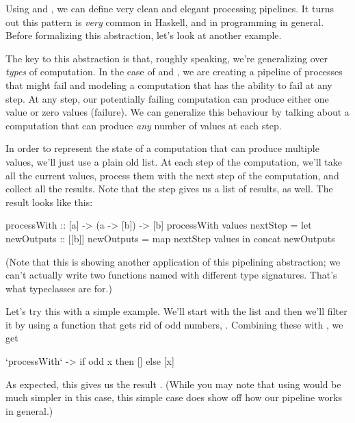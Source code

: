 Using  and , we can define very clean and elegant processing
pipelines. It turns out this pattern is \emph{very} common in Haskell, and in programming in
general. Before formalizing this abstraction, let's look at another example.

The key to this abstraction is that, roughly speaking, we're generalizing over \emph{types} of
computation. In the case of  and , we are creating a pipeline of
processes that might fail and modeling a computation that has the ability to fail at any step. At
any step, our potentially failing computation can produce either one value or zero values (failure).
We can generalize this behaviour by talking about a computation that can produce \emph{any} number
of values at each step.

In order to represent the state of a computation that can produce multiple values, we'll just use a
plain old list. At each step of the computation, we'll take all the current values, process them
with the next step of the computation, and collect all the results. Note that the step gives us a
list of results, as well. The result looks like this:
\begin{haskell}
processWith :: [a] -> (a -> [b]) -> [b]
processWith values nextStep =
  let newOutputs :: [[b]]
      newOutputs = map nextStep values in
    concat newOutputs
\end{haskell}
(Note that this is showing another application of this pipelining abstraction; we can't actually
write two functions named  with different type signatures. That's what
typeclasses are for.)

Let's try this with a simple example. We'll start with the list \inline{[1, 2, 3]} and then we'll
filter it by using a function that gets rid of odd numbers, . Combining these with , we get
\begin{haskell}
[1, 2, 3] `processWith` \x ->
  if odd x
  then []
  else [x]
\end{haskell}
As expected, this gives us the result \inline{[2]}. (While you may note that using 
would be much simpler in this case, this simple case does show off how our pipeline works in
general.)

